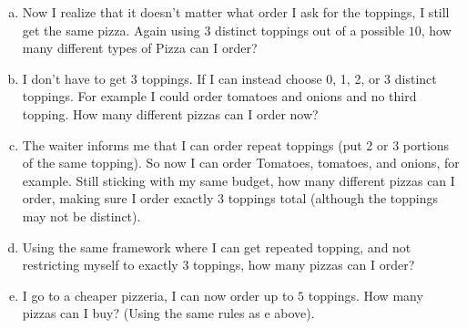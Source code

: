 \documentclass[]{article}
\newif\ifsolutions
\renewcommand{\answer}[1]{{\color{mydarkblue}\textbf{Solution:}#1}}
\begin{document}
\begin{qunlist}
\begin{enumerate}[a)]
\ifsolutions{ \answer { 
$10*9*8$

}}\fi
  
  \qpart
\item Now I realize that it doesn't matter what order I ask for the toppings, I still get the same pizza. Again using $3$ distinct toppings out of a possible $10$, how many different types of Pizza can I order?

\ifsolutions{ \answer { 
$\binom{10}{3}$

}}\fi

  \qpart
\item I don't have to get $3$ toppings. If I can instead choose 0, 1, 2, or 3 distinct toppings. For example I could order tomatoes and onions and no third topping. How many different pizzas can I order now?

\ifsolutions{ \answer { 
$\binom{10}{3} + \binom{10}{2} + \binom{10}{1} + \binom{10}{0}$

}}\fi

  \qpart
\item The waiter informs me that I can order repeat toppings (put 2 or 3 portions of the same topping). So now I can order Tomatoes, tomatoes, and onions, for example. Still sticking with my same budget, how many different pizzas can I order, making sure I order exactly $3$ toppings total (although the toppings may not be distinct).

\ifsolutions{ \answer { 
$\binom{10}{3} + 2*\binom{10}{2} + \binom{10}{1}$

}}\fi

\qpart
\item Using the same framework where I can get repeated topping, and not restricting myself to exactly 3 toppings, how many pizzas can I order?

\ifsolutions{ \answer { 
$\binom{10}{3} + 3*\binom{10}{2} + 3*\binom{10}{1} +\binom{10}{0}$

}}\fi

\qpart
\item I go to a cheaper pizzeria, I can now order up to $5$ toppings. How many  pizzas can I buy? (Using the same rules as e above).

\ifsolutions{ \answer { 

$$ \binom{10}{5} +  [1+\binom{4}{1}]\binom{10}{4} +  [1+ 2\binom{3}{1} + \binom{3}{2}] \binom{10}{3} + [1+ 3*\binom{2}{1} + 3*\binom{2}{2}  ]\binom{10}{2} + 5*\binom{10}{1} + \binom{10}{0}$$

}}\fi

\end{enumerate}


\end{qunlist}
\end{document}
